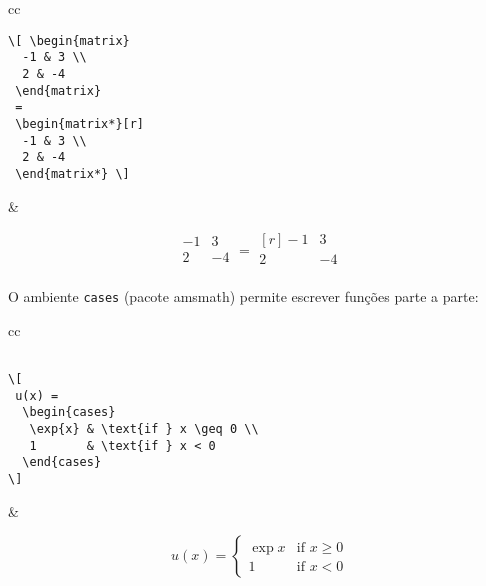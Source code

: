 \documentclass{scrartcl}
\begin{document}
\begin{center}
\begin{tabular}{cc}
\begin{minipage}{0.3\textwidth}
\begin{verbatim}
\[ \begin{matrix}
  -1 & 3 \\
  2 & -4
 \end{matrix}
 =
 \begin{matrix*}[r]
  -1 & 3 \\
  2 & -4
 \end{matrix*} \]
\end{verbatim}
\end{minipage} &
\begin{minipage}{0.4\textwidth}
\[ \begin{matrix}
  -1 & 3 \\
  2 & -4\\
 \end{matrix}
 =
 \begin{matrix*}[r]
  -1 & 3 \\
  2 & -4\\
 \end{matrix*} \]
\end{minipage}
\end{tabular} 
\end{center}

\bigskip

 O ambiente \texttt{cases} (pacote \textsf{amsmath}) permite escrever funções parte a parte:
 
 \begin{tabular}{cc}
\begin{minipage}{0.4\textwidth}
\begin{verbatim}

\[
 u(x) =
  \begin{cases}
   \exp{x} & \text{if } x \geq 0 \\
   1       & \text{if } x < 0
  \end{cases}
\]
\end{verbatim}
\end{minipage}
&
\begin{minipage}{0.4\textwidth}
\[
 u(x) =
  \begin{cases}
   \exp{x} & \text{if } x \geq 0 \\
   1       & \text{if } x < 0
  \end{cases}
\]
\end{minipage}
 \end{tabular}
 
\end{document}

